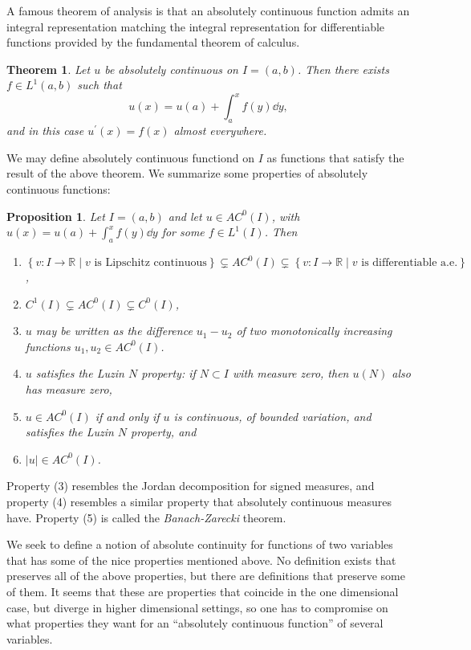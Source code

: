 \documentclass[11pt,leqno]{article}
\theoremstyle{plain}
\newtheorem{theorem}[lem]{Theorem}
\newtheorem{proposition}[lem]{Proposition}
\theoremstyle{definition}
\numberwithin{equation}{section}
\numberwithin{lem}{section}
\newcommand{\cbr}[1]{\left\{#1\right\}}
\begin{document}
A famous theorem of analysis is that an absolutely continuous function admits an integral representation matching the integral representation for differentiable functions provided by the fundamental theorem of calculus.
\begin{theorem}\label{thm1}
    Let $u$ be absolutely continuous on $I = (a,b)$. Then there exists $f\in L^1(a,b)$ such that 
    \begin{equation}\label{2}
        u(x) = u(a) + \int_a^x f(y)\dd y,
    \end{equation} 
    and in this case $u^\prime(x) = f(x)$ almost everywhere.
\end{theorem}
We may define absolutely continuous functiond on $I$ as functions that satisfy the result of the above theorem.
We summarize some properties of absolutely continuous functions:
\begin{proposition}
    Let $I = (a,b)$ and let $u\in AC^0(I)$, with $u(x) = u(a) + \int_a^x f(y)\dd y$ for some $f\in L^1(I)$. Then \begin{enumerate}[label=\textup{(\arabic*)}]
        \item $\cbr{v\colon I\to \mathbb R\mid v \text{ is Lipschitz continuous}}\subsetneq AC^0(I)\subsetneq \cbr{v\colon I\to\mathbb R\mid v\text{ is differentiable a.e.}}$,
        \item $C^1(I)\subsetneq AC^0(I)\subsetneq C^0(I)$,
        \item $u$ may be written as the difference $u_1-u_2$ of two monotonically increasing functions $u_1,u_2\in AC^0(I)$.
        \item $u$ satisfies the Luzin $N$ property: if $N\subset I$ with measure zero, then $u(N)$ also has measure zero,
        \item $u\in AC^0(I)$ if and only if $u$ is continuous, of bounded variation, and satisfies the Luzin $N$ property, and
        \item $|u|\in AC^0(I)$.
    \end{enumerate}
\end{proposition}
Property (3) resembles the Jordan decomposition for signed measures, and property (4) resembles a similar property that absolutely continuous measures have. Property (5) is called the \textit{Banach-Zarecki} theorem.

We seek to define a notion of absolute continuity for functions of two variables that has some of the nice properties mentioned above. No definition exists that preserves all of the above properties, but there are definitions that preserve some of them. It seems that these are properties that coincide in the one dimensional case, but diverge in higher dimensional settings, so one has to compromise on what properties they want for an ``absolutely continuous function'' of several variables.
\end{document}
